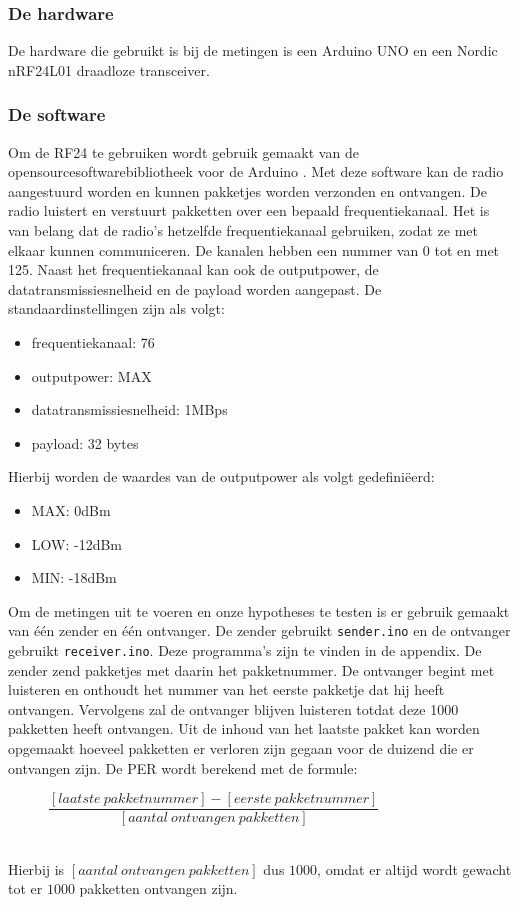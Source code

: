 \documentclass{article}
\begin{document}
\subsubsection{De hardware}
De hardware die gebruikt is bij de metingen is een Arduino UNO en een Nordic nRF24L01 draadloze transceiver.

\subsubsection{De software}
Om de RF24 te gebruiken wordt gebruik gemaakt van de opensourcesoftwarebibliotheek voor de Arduino \cite{rf24}. Met deze software kan de radio aangestuurd worden en kunnen pakketjes worden verzonden en ontvangen. De radio luistert en verstuurt pakketten over een bepaald frequentiekanaal. Het is van belang dat de radio's hetzelfde frequentiekanaal gebruiken, zodat ze met elkaar kunnen communiceren. De kanalen hebben een nummer van 0 tot en met 125. Naast het frequentiekanaal kan ook de outputpower, de datatransmissiesnelheid en de payload worden aangepast. De standaardinstellingen zijn als volgt:
\begin{itemize}
	\item frequentiekanaal: 76
	\item outputpower: MAX
	\item datatransmissiesnelheid: 1MBps
	\item payload: 32 bytes
\end{itemize}
\label{outputpower}
Hierbij worden de waardes van de outputpower als volgt gedefini\"eerd:
\begin{itemize}
	\item MAX: 0dBm
	\item LOW: -12dBm
	\item MIN: -18dBm
\end{itemize}
Om de metingen uit te voeren en onze hypotheses te testen is er gebruik gemaakt van \'{e}\'{e}n zender en \'{e}\'{e}n ontvanger. De zender gebruikt \texttt{sender.ino} en de ontvanger gebruikt \texttt{receiver.ino}. Deze programma's zijn te vinden in de appendix. De zender zend pakketjes met daarin het pakketnummer. De ontvanger begint met luisteren en onthoudt het nummer van het eerste pakketje dat hij heeft ontvangen. Vervolgens zal de ontvanger blijven luisteren totdat deze 1000 pakketten heeft ontvangen. Uit de inhoud van het laatste pakket kan worden opgemaakt hoeveel pakketten er verloren zijn gegaan voor de duizend die er ontvangen zijn. De PER wordt berekend met de formule:\\
\begin{figure}[h]
\center
\indent	$\dfrac{[laatste\ pakketnummer]-[eerste\ pakketnummer]}{[aantal\ ontvangen\ pakketten]}$
\end{figure}\\
Hierbij is $[aantal\ ontvangen\ pakketten]$ dus $1000$, omdat er altijd wordt gewacht tot er $1000$ pakketten ontvangen zijn.
\end{document}
